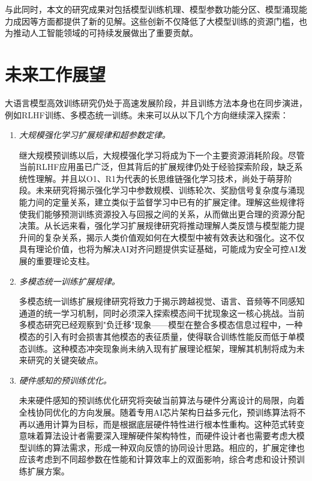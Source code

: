 与此同时，本文的研究成果对包括模型训练机理、模型参数功能分区、模型涌现能力成因等方面都提供了新的见解。这些创新不仅降低了大模型训练的资源门槛，也为推动人工智能领域的可持续发展做出了重要贡献。

\section{未来工作展望}

大语言模型高效训练研究仍处于高速发展阶段，并且训练方法本身也在同步演进，例如RLHF训练、多模态统一训练。未来可以从以下几个方向继续深入探索：

\begin{enumerate}

\item \textit{大规模强化学习扩展规律和超参数定律。} 

继大规模预训练以后，大规模强化学习将成为下一个主要资源消耗阶段。尽管当前RLHF应用虽已广泛，但其背后的扩展规律仍处于经验探索阶段，缺乏系统性理解。并且以O1、R1为代表的长思维链强化学习技术，尚处于萌芽阶段。未来研究将揭示强化学习中参数规模、训练轮次、奖励信号复杂度与涌现能力间的定量关系，建立类似于监督学习中已有的扩展定律。理解这些规律将使我们能够预测训练资源投入与回报之间的关系，从而做出更合理的资源分配决策。从长远来看，强化学习扩展规律研究将推动理解人类反馈与模型能力提升间的复杂关系，揭示人类价值观如何在大模型中被有效表达和强化。这不仅具有理论价值，也将为解决AI对齐问题提供实证基础，可能成为安全可控AI发展的重要理论支柱。

\item \textit{多模态统一训练扩展规律。} 

多模态统一训练扩展规律研究将致力于揭示跨越视觉、语言、音频等不同感知通道的统一学习机制，同时必须深入探索模态间干扰现象这一核心挑战。当前多模态研究已经观察到"负迁移"现象——模型在整合多模态信息过程中，一种模态的引入有时会损害其他模态的表征质量，使得联合训练性能反而低于单模态训练。这种模态冲突现象尚未纳入现有扩展理论框架，理解其机制将成为未来研究的关键突破点。

\item \textit{硬件感知的预训练优化。} 

未来硬件感知的预训练优化研究将突破当前算法与硬件分离设计的局限，向着全栈协同优化的方向发展。随着专用AI芯片架构日益多元化，预训练算法将不再以通用计算为目标，而是根据底层硬件特性进行根本性重构。这种范式转变意味着算法设计者需要深入理解硬件架构特性，而硬件设计者也需要考虑大模型训练的算法需求，形成一种双向反馈的协同设计思路。相应的，扩展定律也应该考虑到不同超参数在性能和计算效率上的双面影响，综合考虑和设计预训练扩展方案。


\end{enumerate}

